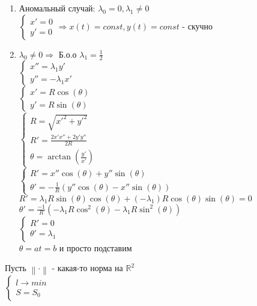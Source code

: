 \documentclass{article}
\newcommand\0{\mathbb{0}}
\newcommand\1{\mathbb{1}}
\newcommand{\Rto}{\Rightarrow}
\newcommand{\norm}[1]{\left\lVert#1\right\rVert}
\begin{document}
\begin{enumerate}
    \item Аномальный случай: $\lambda_0 = 0, \lambda_1 \neq 0$
    $\begin{cases}
        x' = 0\\
        y' = 0
    \end{cases} \Rto x(t) = const, y(t) = const$ - скучно
    \item $\lambda_0 \neq 0 \Rto$ Б.о.о $\lambda_1 = \frac{1}{2}$\\
    $\begin{cases}
        x'' = \lambda_1y'\\
        y'' = -\lambda_1x'
    \end{cases}$\\
    $\begin{cases}
        x' = R \cos(\theta)\\
        y' = R \sin(\theta)
    \end{cases}$\\
    $\begin{cases}
        R = \sqrt{x'^2 + y'^2}\\
        R' = \frac{2x'x'' + 2y'y''}{2R}\\
        \theta = \arctan(\frac{y'}{x'})
    \end{cases}$\\
    $\begin{cases}
        R' = x'' \cos(\theta) + y'' \sin(\theta)\\
        \theta' = -\frac{1}{R}(y''\cos(\theta) - x''\sin(\theta))
    \end{cases}$\\
    $R' = \lambda_1R \sin(\theta)\cos(\theta) + (-\lambda_1)R\cos(\theta)\sin(\theta) = 0$\\
    $\theta' = \frac{-1}{R}(-\lambda_1 R \cos^2(\theta) - \lambda_1 R \sin^2(\theta))$\\
    $\begin{cases}
        R' = 0\\
        \theta' = \lambda_1
    \end{cases}$\\
    $\theta = at = b$ и просто подставим\\
\end{enumerate}
Пусть $\norm{\cdot}$ - какая-то норма на $\mathbb{R}^2$\\
$\begin{cases}
    l \to min\\
    S = S_0
\end{cases}$\\
\end{document}
